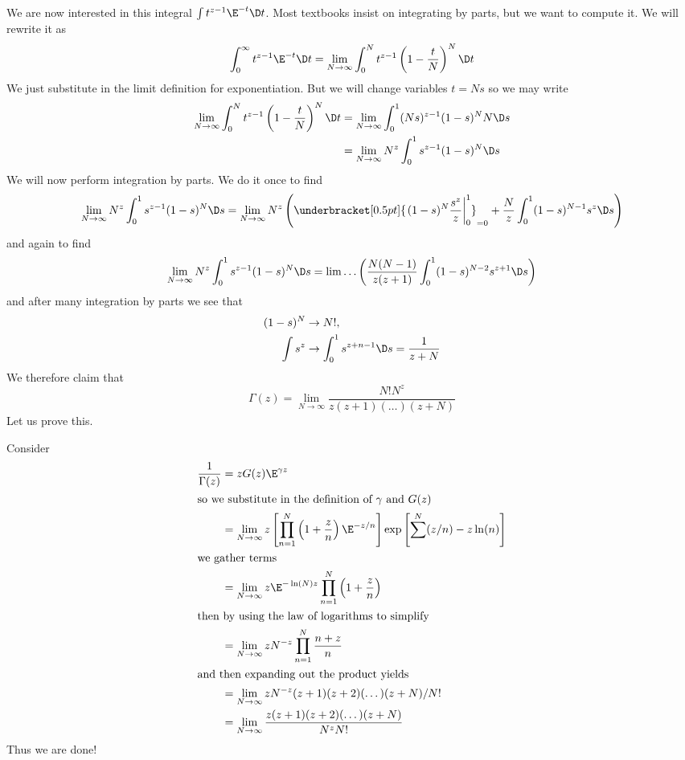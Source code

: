 We are now interested in this integral $\int t^{z-1}\E^{-t}\D
t$. Most textbooks insist on integrating by parts, but we want to
compute it. We will rewrite it as
\begin{equation}
\int^{\infty}_{0}t^{z-1}\E^{-t}\D t=\lim_{N\to\infty}\int^{N}_{0}t^{z-1}\left(1-\frac{t}{N}\right)^{N}\D t
\end{equation}
We just substitute in the limit definition for
exponentiation. But we will change variables $t=Ns$ so we may
write
\begin{equation}
\begin{split}
\lim_{N\to\infty}\int^{N}_{0}t^{z-1}\left(1-\frac{t}{N}\right)^{N}\D t
&= \lim_{N\to\infty}\int^{1}_{0}(Ns)^{z-1}(1-s)^{N}N\D s\\
&= \lim_{N\to\infty}N^{z}\int^{1}_{0}s^{z-1}(1-s)^{N}\D s
\end{split}
\end{equation}
We will now perform integration by parts. We do it once to find
\begin{equation}
\lim_{N\to\infty}N^{z}\int^{1}_{0}s^{z-1}(1-s)^{N}\D
s=\lim_{N\to\infty}N^{z}\left(\underbracket[0.5pt]{\left.(1-s)^{N}\frac{s^{z}}{z}\right|^{1}_{0}}_{=0}+\frac{N}{z}\int^{1}_{0}(1-s)^{N-1}s^{z}\D
s\right)
\end{equation}
and again to find
\begin{equation}
\lim_{N\to\infty}N^{z}\int^{1}_{0}s^{z-1}(1-s)^{N}\D
s=\lim\dots\left(\frac{N(N-1)}{z(z+1)}\int^{1}_{0}(1-s)^{N-2}s^{z+1}\D s\right)
\end{equation}
and after many integration by parts we see that
\begin{equation}
\begin{split}
(1-s)^{N} & \to N!,\\
\int s^{z}& \to \int^{1}_{0}s^{z+n-1}\D s=\frac{1}{z+N}
\end{split}
\end{equation}
We therefore claim that
\begin{equation}
\Gamma(z)=\lim_{N\to\infty}\frac{N!N^{z}}{z(z+1)(\dots)(z+N)}
\end{equation}
Let us prove this.

Consider
\begin{subequations}
\begin{align}
\frac{1}{\Gamma(z)} &= zG(z)\E^{\gamma z}\\
\intertext{so we substitute in the definition of $\gamma$ and $G(z)$}
&=\lim_{N\to\infty}
z\left[\prod^{N}_{n=1}\left(1+\frac{z}{n}\right)\E^{-z/n}\right]\exp\left[{\sum^{N}(z/n)-z\ln(n)}\right]\\
\intertext{we gather terms}
&=\lim_{N\to\infty}z\E^{-\ln(N)z}\prod^{N}_{n=1}\left(1+\frac{z}{n}\right)\\
\intertext{then by using the law of logarithms to simplify}
&=\lim_{N\to\infty}zN^{-z}\prod^{N}_{n=1}\frac{n+z}{n}\\
\intertext{and then expanding out the product yields}
&=\lim_{N\to\infty}zN^{-z}(z+1)(z+2)(\dots)(z+N)/N!\\
&=\lim_{N\to\infty}\frac{z(z+1)(z+2)(\dots)(z+N)}{N^{z}N!}
\end{align}
\end{subequations}
Thus we are done!

